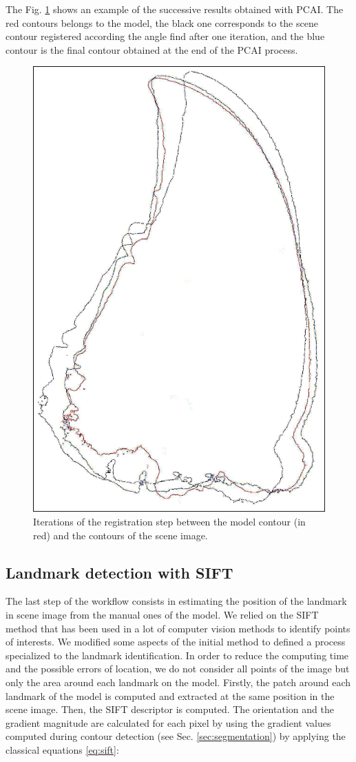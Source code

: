 \documentclass[twoside,twocolumn,10pt]{article}
\begin{document}
The Fig. \ref{fig:box} shows an example of the successive results obtained with PCAI.
The red contours belongs to the model, the black one corresponds to the scene contour registered according the angle find after one iteration, and the blue contour is the
final contour obtained at the end of the PCAI process.

\begin{figure}[htbp]
    \centering
    \includegraphics[width=.265\textwidth]{./images/imreg}
    \caption{Iterations of the registration step between the model contour (in red) and the contours of the scene image.}
    \label{fig:box}
\end{figure}

\subsection{Landmark detection with SIFT}
\label{sec:sift}

The last step of the workflow consists in estimating the position of the landmark in scene image from the manual ones of the model.
We relied on the SIFT method \cite{lowe2004distinctive} that has been used in a lot of computer vision methods to identify points of interests.
We modified some aspects of the initial method to defined a process specialized to the landmark identification.
In order to reduce the computing time and the possible errors of location, we do not consider all points of the image but only the area around each landmark on the model.
Firstly, the patch around each landmark of the model is computed and extracted at the same position in the scene image.
Then, the SIFT descriptor is computed.
The orientation and the gradient magnitude are calculated for each pixel by using the gradient values computed during contour detection (see Sec. \ref{sec:segmentation}) by applying the classical equations \ref{eq:sift}:
\end{document}
